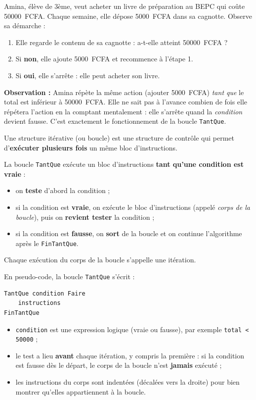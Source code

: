 \documentclass[11pt]{article}
\newcommand{\cle}[1]{{\popxbold\color{popdark}#1}}
\begin{document}
\begin{experience}
Amina, élève de 3ème, veut acheter un livre de préparation au BEPC qui coûte \SI{50000}{FCFA}. Chaque semaine, elle dépose \SI{5000}{FCFA} dans sa cagnotte. Observe sa démarche :
\begin{enumerate}
  \item Elle regarde le contenu de sa cagnotte : a-t-elle atteint \SI{50000}{FCFA} ?
  \item Si \textbf{non}, elle ajoute \SI{5000}{FCFA} et recommence à l'étape 1.
  \item Si \textbf{oui}, elle s'arrête : elle peut acheter son livre.
\end{enumerate}
\textbf{Observation :} Amina répète la même action (ajouter \SI{5000}{FCFA}) \emph{tant que} le total est inférieur à \SI{50000}{FCFA}. Elle ne sait pas à l'avance combien de fois elle répétera l'action en la comptant mentalement : elle s'arrête quand la \emph{condition} devient fausse. C'est exactement le fonctionnement de la boucle \texttt{TantQue}.
\end{experience}

\begin{definition}
Une \cle{structure itérative} (ou \cle{boucle}) est une structure de contrôle qui permet d'\textbf{exécuter plusieurs fois} un même bloc d'instructions.

La boucle \texttt{TantQue} exécute un bloc d'instructions \textbf{tant qu'une condition est vraie} :
\begin{itemize}
  \item on \textbf{teste} d'abord la condition ;
  \item si la condition est \textbf{vraie}, on exécute le bloc d'instructions (appelé \emph{corps de la boucle}), puis on \textbf{revient tester} la condition ;
  \item si la condition est \textbf{fausse}, on \textbf{sort} de la boucle et on continue l'algorithme après le \texttt{FinTantQue}.
\end{itemize}
Chaque exécution du corps de la boucle s'appelle une \cle{itération}.
\end{definition}

\begin{propriete}
En pseudo-code, la boucle \texttt{TantQue} s'écrit :
\begin{lstlisting}
TantQue condition Faire
    instructions
FinTantQue
\end{lstlisting}
\begin{itemize}
  \item \texttt{condition} est une expression logique (vraie ou fausse), par exemple \texttt{total < 50000} ;
  \item le test a lieu \textbf{avant} chaque itération, y compris la première : si la condition est fausse dès le départ, le corps de la boucle n'est \textbf{jamais} exécuté ;
  \item les instructions du corps sont indentées (décalées vers la droite) pour bien montrer qu'elles appartiennent à la boucle.
\end{itemize}
\end{propriete}
\end{document}
